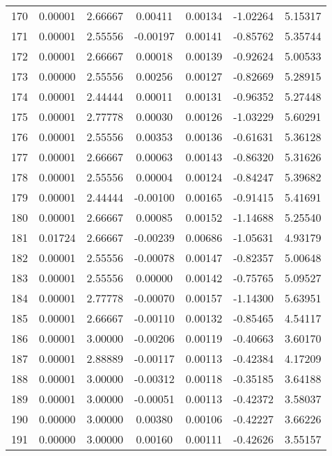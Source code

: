 \begin{longtable}{c c c c c c c}
170 &  0.00001 &      2.66667 &  0.00411 &   0.00134 &  -1.02264 &   5.15317 \\
171 &  0.00001 &      2.55556 & -0.00197 &   0.00141 &  -0.85762 &   5.35744 \\
172 &  0.00001 &      2.66667 &  0.00018 &   0.00139 &  -0.92624 &   5.00533 \\
173 &  0.00000 &      2.55556 &  0.00256 &   0.00127 &  -0.82669 &   5.28915 \\
174 &  0.00001 &      2.44444 &  0.00011 &   0.00131 &  -0.96352 &   5.27448 \\
175 &  0.00001 &      2.77778 &  0.00030 &   0.00126 &  -1.03229 &   5.60291 \\
176 &  0.00001 &      2.55556 &  0.00353 &   0.00136 &  -0.61631 &   5.36128 \\
177 &  0.00001 &      2.66667 &  0.00063 &   0.00143 &  -0.86320 &   5.31626 \\
178 &  0.00001 &      2.55556 &  0.00004 &   0.00124 &  -0.84247 &   5.39682 \\
179 &  0.00001 &      2.44444 & -0.00100 &   0.00165 &  -0.91415 &   5.41691 \\
180 &  0.00001 &      2.66667 &  0.00085 &   0.00152 &  -1.14688 &   5.25540 \\
181 &  0.01724 &      2.66667 & -0.00239 &   0.00686 &  -1.05631 &   4.93179 \\
182 &  0.00001 &      2.55556 & -0.00078 &   0.00147 &  -0.82357 &   5.00648 \\
183 &  0.00001 &      2.55556 &  0.00000 &   0.00142 &  -0.75765 &   5.09527 \\
184 &  0.00001 &      2.77778 & -0.00070 &   0.00157 &  -1.14300 &   5.63951 \\
185 &  0.00001 &      2.66667 & -0.00110 &   0.00132 &  -0.85465 &   4.54117 \\
186 &  0.00001 &      3.00000 & -0.00206 &   0.00119 &  -0.40663 &   3.60170 \\
187 &  0.00001 &      2.88889 & -0.00117 &   0.00113 &  -0.42384 &   4.17209 \\
188 &  0.00001 &      3.00000 & -0.00312 &   0.00118 &  -0.35185 &   3.64188 \\
189 &  0.00001 &      3.00000 & -0.00051 &   0.00113 &  -0.42372 &   3.58037 \\
190 &  0.00000 &      3.00000 &  0.00380 &   0.00106 &  -0.42227 &   3.66226 \\
191 &  0.00000 &      3.00000 &  0.00160 &   0.00111 &  -0.42626 &   3.55157 \\

\end{longtable}
